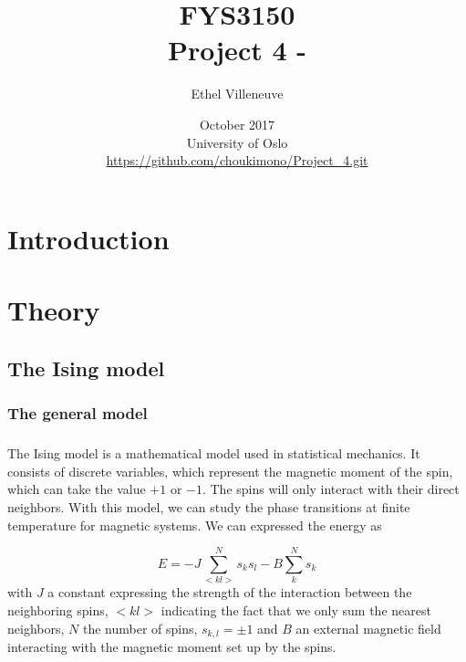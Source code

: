 \documentclass[a4paper, twoside, 11pt]{report}
\title{FYS3150\\Project 4 - }
\author{Ethel Villeneuve}
\date{October 2017 \\University of Oslo \\ \url{https://github.com/choukimono/Project_4.git}}
\theoremstyle{theorem}
\theoremstyle{remark}
\theoremstyle{exemple}
\begin{document}
\maketitle
	
	
\begin{abstract}
    
    \paragraph{}
    
\end{abstract}


\tableofcontents


\chapter*{Introduction}

    \paragraph{}
    

\chapter{Theory}
    
    \section{The Ising model}
    
        \subsection{The general model}
        
            \paragraph{}The Ising model is a mathematical model used in statistical mechanics. It consists of discrete variables, which represent the magnetic moment of the spin, which can take the value $+1$ or $-1$. The spins will only interact with their direct neighbors. With this model, we can study the phase transitions at finite temperature for magnetic systems. We can expressed the energy as 
                
                \begin{equation*}
                    E = -J \sum\limits_{<kl>}^{N}s_ks_l - B \sum\limits_{k}^{N}s_k
                    \tag{1}
                \end{equation*}
            with $J$ a constant expressing the strength of the interaction between the neighboring spins, $<kl>$ indicating the fact that we only sum the nearest neighbors, $N$ the number of spins, $s_{k,l} = \pm 1$ and $B$ an external magnetic field interacting with the magnetic moment set up by the spins. \\
            
\end{document}
